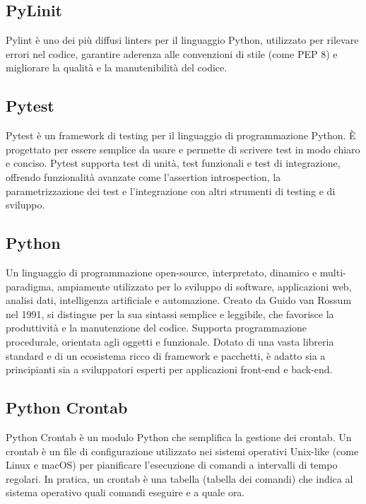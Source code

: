 \hypertarget{sec:pylint}{}
\subsection*{PyLinit}
Pylint è uno dei più diffusi linters per il linguaggio Python, utilizzato per rilevare errori nel codice, garantire aderenza 
alle convenzioni di stile (come PEP 8) e migliorare la qualità e la manutenibilità del codice.

\hypertarget{sec:pytest}{}
\subsection*{Pytest}
Pytest è un framework di testing per il linguaggio di programmazione Python. È progettato per essere semplice da usare e
permette di scrivere test in modo chiaro e conciso. Pytest supporta test di unità, test funzionali e test di integrazione,
offrendo funzionalità avanzate come l'assertion introspection, la parametrizzazione dei test e l'integrazione con altri
strumenti di testing e di sviluppo.

\hypertarget{sec:python}{}
\subsection*{Python}
Un linguaggio di programmazione open-source, interpretato, dinamico e multi-paradigma, ampiamente utilizzato per lo sviluppo di software, applicazioni web, 
analisi dati, intelligenza artificiale e automazione. Creato da Guido van Rossum nel 1991, si distingue per la sua sintassi semplice e leggibile, che 
favorisce la produttività e la manutenzione del codice. Supporta programmazione procedurale, orientata agli oggetti e funzionale. Dotato di una vasta 
libreria standard e di un ecosistema ricco di framework e pacchetti, è adatto sia a principianti sia a sviluppatori esperti per applicazioni front-end e 
back-end.

\hypertarget{sec:python_crontab}{}
\subsection*{Python Crontab}
Python Crontab è un modulo Python che semplifica la gestione dei crontab. Un crontab è un file di configurazione utilizzato nei 
sistemi operativi Unix-like (come Linux e macOS) per pianificare l'esecuzione di comandi a intervalli di tempo regolari. In pratica, 
un crontab è una tabella (tabella dei comandi) che indica al sistema operativo quali comandi eseguire e a quale ora.

